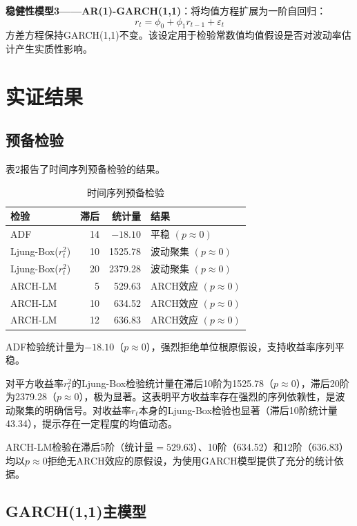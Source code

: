 \documentclass[11pt,a4paper]{article}
\begin{document}
\textbf{稳健性模型3——AR(1)-GARCH(1,1)}：将均值方程扩展为一阶自回归：
\[
r_t = \phi_0 + \phi_1 r_{t-1} + \varepsilon_t
\]
方差方程保持GARCH(1,1)不变。该设定用于检验常数值均值假设是否对波动率估计产生实质性影响。

\section{实证结果}

\subsection{预备检验}

表2报告了时间序列预备检验的结果。

\begin{table}[ht]
\centering
\caption{时间序列预备检验}
\begin{tabular}{lrrl}
\toprule
检验 & 滞后 & 统计量 & 结果 \\
\midrule
ADF & 14 & $-18.10$ & 平稳 \((p\approx 0)\) \\
Ljung-Box(\(r_t^2\)) & 10 & 1525.78 & 波动聚集 \((p\approx 0)\) \\
Ljung-Box(\(r_t^2\)) & 20 & 2379.28 & 波动聚集 \((p\approx 0)\) \\
ARCH-LM & 5 & 529.63 & ARCH效应 \((p\approx 0)\) \\
ARCH-LM & 10 & 634.52 & ARCH效应 \((p\approx 0)\) \\
ARCH-LM & 12 & 636.83 & ARCH效应 \((p\approx 0)\) \\
\bottomrule
\end{tabular}
\end{table}

ADF检验统计量为$-18.10$（\(p\approx 0\)），强烈拒绝单位根原假设，支持收益率序列平稳。

对平方收益率\(r_t^2\)的Ljung-Box检验统计量在滞后10阶为1525.78（\(p\approx 0\)），滞后20阶为2379.28（\(p\approx 0\)），极为显著。这表明平方收益率存在强烈的序列依赖性，是波动聚集的明确信号。对收益率\(r_t\)本身的Ljung-Box检验也显著（滞后10阶统计量43.34），提示存在一定程度的均值动态。

ARCH-LM检验在滞后5阶（统计量$=529.63$）、10阶（634.52）和12阶（636.83）均以\(p\approx 0\)拒绝无ARCH效应的原假设，为使用GARCH模型提供了充分的统计依据。

\subsection{GARCH(1,1)主模型}
\end{document}
